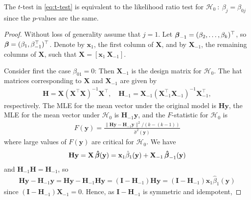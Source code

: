 \begin{theorem}
    The $t$-test in \eqref{eq:t-test} is equivalent to the likelihood ratio test for $\mathcal{H}_0 \ : \ \beta_j = \beta_{0j}$ since the $p$-values are the same.
\end{theorem}
\begin{proof}
    Without loss of generality assume that $j = 1$.
    Let $\operatorname{\boldsymbol{\beta}}_{-1} = (\beta_2, \ldots, \beta_k)^\top$, so $\operatorname{\boldsymbol{\beta}} = (\beta_1, \beta_{-1}^\top)^\top$.
    Denote by $\textbf{x}_1$, the first column of $\textbf{X}$, and by $\textbf{X}_{-1}$, the remaining columns of $\textbf{X}$, such that $\textbf{X} = \left[\textbf{x}_1 \ \textbf{X}_{-1}\right]$.
    
    Consider first the case $\beta_{01} = 0$: Then $\textbf{X}_{-1}$ is the design matrix for $\mathcal{H}_0$.
    The hat matrices corresponding to $\textbf{X}$ and $\textbf{X}_{-1}$ are given by
    \begin{align*}
        \textbf{H} = \textbf{X}(\textbf{X}^\top\textbf{X})^{-1}\textbf{X}^\top, \quad \mathbf{H}_{-1} = \textbf{X}_{-1}(\textbf{X}^\top_{-1}\textbf{X}_{-1})^{-1}\textbf{X}^\top_{-1},
    \end{align*}
    respectively.
    The MLE for the mean vector under the original model is $\textbf{H}\textbf{y}$, the MLE for the mean vector under $\mathcal{H}_0$ is $\textbf{H}_{-1}\textbf{y}$, and the $F$-statistic for $\mathcal{H}_0$ is
    \begin{align*}
        F(\textbf{y}) = \frac{\|\textbf{H}\textbf{y} - \textbf{H}_{-1}\textbf{y}\|^2/(k-(k-1))}{\hat{\sigma}^2(\textbf{y})}
    \end{align*}
    where large values of $F(\textbf{y})$ are critical for $\mathcal{H}_0$.
    We have
    \begin{align*}
        \textbf{H}\textbf{y} = \textbf{X}\operatorname{\boldsymbol{\hat{\beta}}}(\textbf{y}) = \textbf{x}_1\hat{\beta}_1(\textbf{y}) + \textbf{X}_{-1} \operatorname{\boldsymbol{\hat{\beta}}}_{-1}(\textbf{y})
    \end{align*}
    and $\textbf{H}_{-1}\textbf{H} = \textbf{H}_{-1}$, so
    \begin{align*}
        \textbf{H}\textbf{y}-\textbf{H}_{-1}\textbf{y} = 
        \textbf{H}\textbf{y}-\textbf{H}_{-1}\textbf{H}\textbf{y} =
        (\textbf{I} - \textbf{H}_{-1})\textbf{H}\textbf{y} = 
        (\textbf{I} - \textbf{H}_{-1})\textbf{x}_1\hat{\beta}_1(\textbf{y})
    \end{align*}
    since $(\textbf{I} - \textbf{H}_{-1})\textbf{X}_{-1} = 0$.
    Hence, as $\textbf{I} - \textbf{H}_{-1}$ is symmetric and idempotent,

\end{proof}
